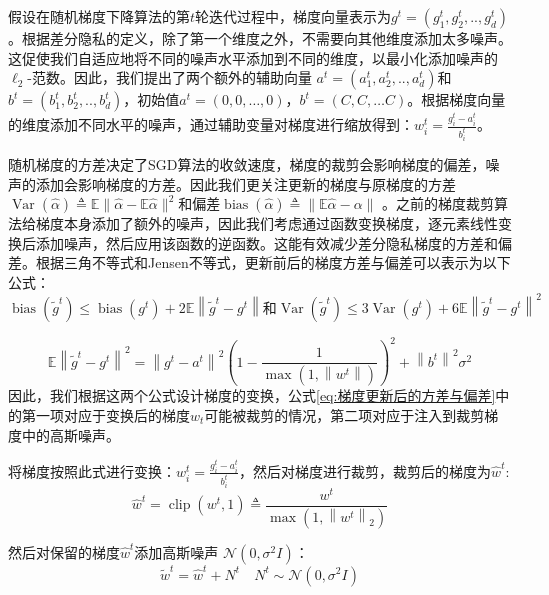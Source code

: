假设在随机梯度下降算法的第$t$轮迭代过程中，梯度向量表示为$g^{t}=\left(g_{1}^{t}, g_{2}^{t}, . ., g_{d}^{t}\right)$。根据差分隐私的定义，除了第一个维度之外，不需要向其他维度添加太多噪声。这促使我们自适应地将不同的噪声水平添加到不同的维度，以最小化添加噪声的 $\ell_{2}$-范数。因此，我们提出了两个额外的辅助向量 $a^{t}=\left(a_{1}^{t}, a_{2}^{t}, . ., a_{d}^{t}\right)$和$b^{t}=\left(b_{1}^{t}, b_{2}^{t}, . ., b_{d}^{t}\right)$，初始值$a^{t}=(0,0, \ldots, 0)$，$b^{t}=(C, C, \ldots C)$。根据梯度向量的维度添加不同水平的噪声，通过辅助变量对梯度进行缩放得到：$w_{i}^{t}=\frac{g_{i}^{t}-a_{i}^{t}}{b_{i}^{t}}$。

随机梯度的方差决定了SGD算法的收敛速度，梯度的裁剪会影响梯度的偏差，噪声的添加会影响梯度的方差。因此我们更关注更新的梯度与原梯度的方差$\operatorname{Var}(\hat{\alpha}) \triangleq \mathbb{E}\|\hat{\alpha}-\mathbb{E} \hat{\alpha}\|^{2}$和偏差$\operatorname{bias}(\hat{\alpha}) \triangleq\|\mathbb{E} \hat{\alpha}-\alpha\|$ 。之前的梯度裁剪算法给梯度本身添加了额外的噪声，因此我们考虑通过函数变换梯度，逐元素线性变换后添加噪声，然后应用该函数的逆函数。这能有效减少差分隐私梯度的方差和偏差。根据三角不等式和Jensen不等式，更新前后的梯度方差与偏差可以表示为以下公式：
\begin{equation}\label{eq:梯度更新后的方差与偏差}
\operatorname{bias}\left(\tilde{g}^{t}\right) \leq \operatorname{bias}\left(g^{t}\right)+2 \mathbb{E}\left\|\tilde{g}^{t}-g^{t}\right\| \text {和} \operatorname{Var}\left(\tilde{g}^{t}\right) \leq 3 \operatorname{Var}\left(g^{t}\right)+6 \mathbb{E}\left\|\tilde{g}^{t}-g^{t}\right\|^{2}
\end{equation}

\begin{equation}
\mathbb{E}\left\|\tilde{g}^{t}-g^{t}\right\|^{2}=\left\|g^{t}-a^{t}\right\|^{2}\left(1-\frac{1}{\max \left(1,\left\|w^{t}\right\|\right)}\right)^{2}+\left\|b^{t}\right\|^{2} \sigma^{2}
\end{equation}
因此，我们根据这两个公式设计梯度的变换，公式\ref{eq:梯度更新后的方差与偏差}中的第一项对应于变换后的梯度$w_{t}$可能被裁剪的情况，第二项对应于注入到裁剪梯度中的高斯噪声。

将梯度按照此式进行变换：$w_{i}^{t}=\frac{g_{i}^{t}-a_{i}^{t}}{b_{i}^{t}}$，然后对梯度进行裁剪，裁剪后的梯度为$\hat{w}^{t}$:
\begin{equation}
\hat{w}^{t}=\operatorname{clip}\left(w^{t}, 1\right) \triangleq \frac{w^{t}}{\max \left(1,\left\|w^{t}\right\|_{2}\right)}
\end{equation}

然后对保留的梯度$\hat{w}^{t}$添加高斯噪声 $\mathcal{N}\left(0, \sigma^{2} I\right)$：
\begin{equation}
\tilde{w}^{t}=\hat{w}^{t}+N^{t} \quad N^{t} \sim \mathcal{N}\left(0, \sigma^{2} I\right)
\end{equation}

